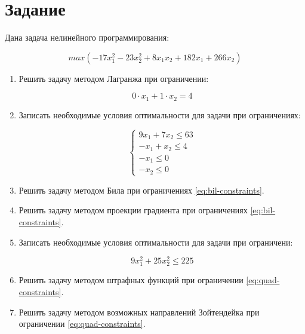





\section{Задание}

Дана задача нелинейного программирования:

\begin{equation}
\label{eq:target}
	max \left( -17 x^2_1 - 23 x^2_2 + 8 x_1 x_2 + 182 x_1 + 266 x_2 \right)
\end{equation}

\begin{enumerate}

	\item Решить задачу методом Лагранжа при ограничении: 
	
		\begin{equation}
		\label{eq:lagrange-constraints}
			0 \cdot x_1 + 1 \cdot x_2 = 4
		\end{equation}
	
	\item Записать необходимые условия оптимальности для задачи при ограничениях:
	
		\begin{equation}
		\label{eq:bil-constraints}
			\begin{cases}
				9 x_1 + 7 x_2 \leq 63
				\\
				-x_1 + x_2 \leq 4
				\\
				-x_1 \leq 0
				\\
				-x_2 \leq 0
			\end{cases}
		\end{equation}
	
	\item Решить задачу методом Била при ограничениях \ref{eq:bil-constraints}.
	
	\item Решить задачу методом проекции градиента при ограничениях \ref{eq:bil-constraints}.	
	
	\item Записать необходимые условия оптимальности для задачи при ограничени:
	
	\begin{equation}
	\label{eq:quad-constraints}
		9 x_1^2 + 25 x_2^2 \leq 225
	\end{equation}

	\item Решить задачу методом штрафных функций при ограничении \ref{eq:quad-constraints}.
	
	\item Решить задачу методом возможных направлений Зойтендейка при ограничении \ref{eq:quad-constraints}.

\end{enumerate}

